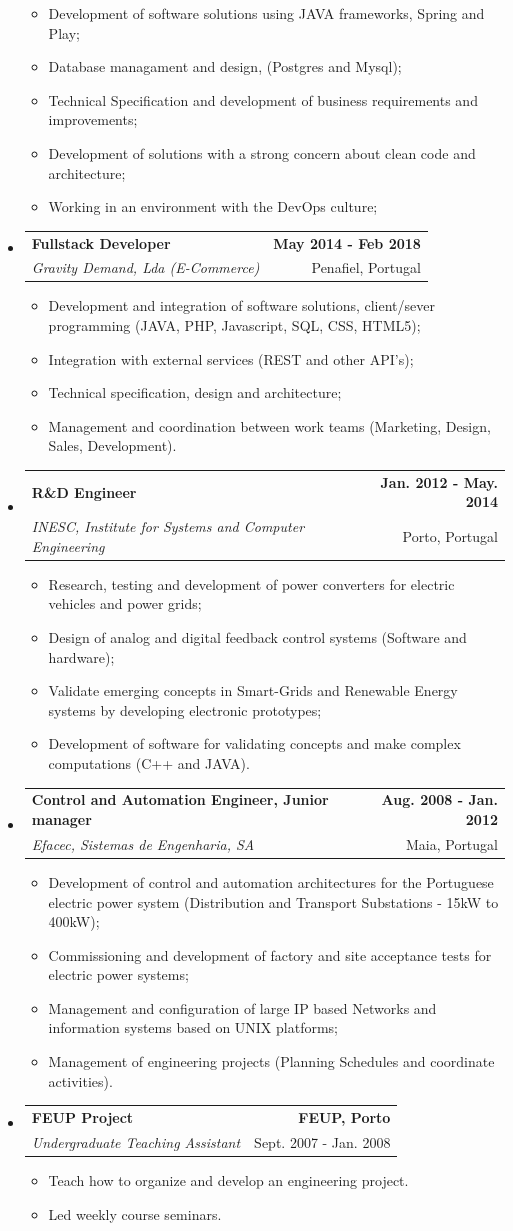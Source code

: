 \documentclass[letterpaper,11pt]{article}
\makeatletter
\newcommand{\resitem}[1]{\item #1 \vspace{2pt}}
\newcommand{\ressubheading}[4]
{
    \begin{tabular*}{6.5in}{@{\extracolsep{\fill}}l r}
        {\textbf{#1}}&{\textbf{#2}}\\
        {\textit{#3}}&{#4}
    \end{tabular*}
}
\makeatother
\begin{document}
\begin{itemize}
\begin{itemize}
		\resitem{Development of software solutions using JAVA frameworks, Spring and Play;}
        \resitem{Database managament and design, (Postgres and Mysql);}
		\resitem{Technical Specification and development of business requirements and improvements;}
        \resitem{Development of solutions with a strong concern about clean code and architecture;}
        \resitem{Working in an environment with the DevOps culture;}
	\end{itemize}
\item 
	\ressubheading{Fullstack Developer}{May 2014 - Feb 2018}{Gravity Demand, Lda (E-Commerce)}{Penafiel, Portugal} %
	\begin{itemize}
		\resitem{Development and integration of software solutions, client/sever programming (JAVA, PHP, Javascript, SQL, CSS, HTML5);}
		\resitem{Integration with external services (REST and other API's);}
		\resitem{Technical specification, design and architecture;}
		\resitem{Management and coordination between work teams (Marketing, Design, Sales, Development).}
	\end{itemize}
\item
	\ressubheading{R\&D Engineer}{Jan. 2012 - May. 2014}{INESC, Institute for Systems and Computer Engineering}{Porto, Portugal}%
	\begin{itemize}
		\resitem{Research, testing and development of power converters for electric vehicles and power grids;}
        \resitem{Design of analog and digital feedback control systems (Software and hardware);}
		\resitem{Validate emerging concepts in Smart-Grids and Renewable Energy systems  by developing electronic prototypes;}
        \resitem{Development of software for validating concepts and make complex computations (C++ and JAVA).}
	\end{itemize}

\item 
	\ressubheading{Control and Automation Engineer, Junior manager}{Aug. 2008 - Jan. 2012}{Efacec, Sistemas de Engenharia, SA}{Maia, Portugal} %
	\begin{itemize}
		\resitem{Development of control and automation architectures for the Portuguese electric power system (Distribution and Transport Substations - 15kW to 400kW);} %
		\resitem{Commissioning and development of factory and site acceptance tests for electric power systems;}
		\resitem{Management and configuration of large IP based Networks and information systems based on UNIX platforms;}
		\resitem{Management of engineering projects (Planning Schedules and coordinate activities).}
	\end{itemize}
\item
	\ressubheading{FEUP Project}{FEUP, Porto}{Undergraduate Teaching Assistant}{Sept. 2007 - Jan. 2008}%
	\begin{itemize}
		\resitem{Teach how to organize and develop an engineering project.}
		\resitem{Led weekly course seminars.}
	\end{itemize}
\end{itemize}
\end{document}
